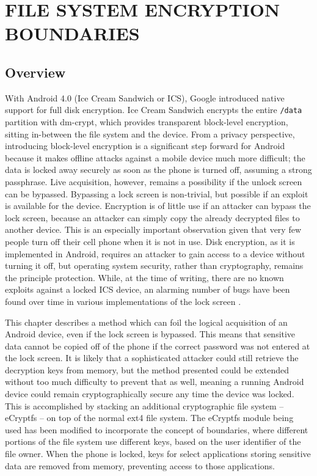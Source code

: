 \chapter{FILE SYSTEM ENCRYPTION BOUNDARIES}
\label{ch:ecryptfs}

\section{Overview} 
With Android 4.0 (Ice Cream Sandwich or ICS), Google introduced native support for full disk encryption. Ice Cream Sandwich encrypts
the entire \texttt{/data} partition with dm-crypt, which provides transparent block-level encryption, sitting in-between
the file system and the device. From a privacy perspective, introducing block-level encryption is a significant step forward for
Android because it makes offline attacks against a mobile device much more difficult; the data is locked away securely as soon as
the phone is turned off, assuming a strong passphrase. Live acquisition, however, remains a possibility if the unlock screen can be
bypassed.  Bypassing a lock screen is non-trivial, but possible if an exploit is available for the device. Encryption is of little
use if an attacker can bypass the lock screen, because an attacker can simply copy the already decrypted files to another device.
This is an especially important observation given that very few people turn off their cell phone when it is not in use. Disk
encryption, as it is implemented in Android, requires an attacker to gain access to a device without turning it off, but operating
system security, rather than cryptography, remains the principle protection. While, at the time of writing, there are no known
exploits against a locked ICS device, an alarming number of bugs have been found over time in various implementations of the lock
screen \cite{hoog, lockscreenbypass0, lockscreenbypass1, lockscreenbypass2}.

This chapter describes a method which can foil the logical acquisition of an Android device, even if the lock screen is
bypassed. This means that sensitive data cannot be copied off of the phone if the correct password was not entered at the lock
screen. It is likely that a sophisticated attacker could still retrieve the decryption keys from memory, but the method presented
could be extended without too much difficulty to prevent that as well, meaning a running Android device could remain
cryptographically secure any time the device was locked. This is accomplished by stacking an additional cryptographic file system 
-- eCryptfs -- on top of the normal ext4 file system. The eCryptfs module being used has been modified to incorporate the concept of
boundaries, where different portions of the file system use different keys, based on the user identifier of the file owner. When the phone
is locked, keys for select applications storing sensitive data are removed from memory, preventing access to those applications.

